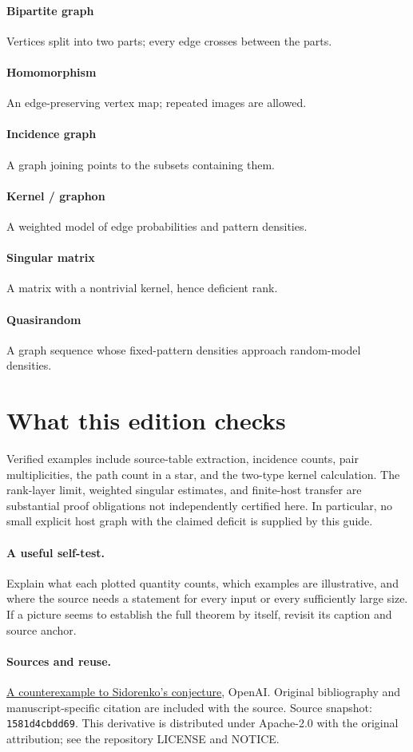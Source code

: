 \documentclass[11pt]{article}
\begin{document}
\paragraph{Bipartite graph}Vertices split into two parts; every edge crosses between the parts.
\paragraph{Homomorphism}An edge-preserving vertex map; repeated images are allowed.
\paragraph{Incidence graph}A graph joining points to the subsets containing them.
\paragraph{Kernel / graphon}A weighted model of edge probabilities and pattern densities.
\paragraph{Singular matrix}A matrix with a nontrivial kernel, hence deficient rank.
\paragraph{Quasirandom}A graph sequence whose fixed-pattern densities approach random-model densities.
\section*{What this edition checks}Verified examples include source-table extraction, incidence counts, pair multiplicities, the path count in a star, and the two-type kernel calculation. The rank-layer limit, weighted singular estimates, and finite-host transfer are substantial proof obligations not independently certified here. In particular, no small explicit host graph with the claimed deficit is supplied by this guide.
\paragraph{A useful self-test.} Explain what each plotted quantity counts, which examples are illustrative, and where the source needs a statement for every input or every sufficiently large size. If a picture seems to establish the full theorem by itself, revisit its caption and source anchor.\paragraph{Sources and reuse.}\href{https://github.com/openai/math/tree/1581d4cbdd69a0faf34b2089614fe2a814316a6a/preprints/A-counterexample-to-Sidorenkos-conjecture-September-23-2026}{A counterexample to Sidorenko's conjecture}, OpenAI. Original bibliography and manuscript-specific citation are included with the source. Source snapshot: \texttt{1581d4cbdd69}. This derivative is distributed under Apache-2.0 with the original attribution; see the repository LICENSE and NOTICE.
\end{document}
